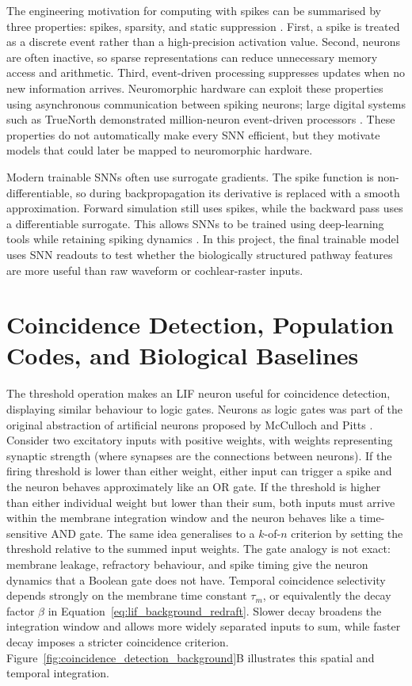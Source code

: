 The engineering motivation for computing with spikes can be summarised by three properties: spikes, sparsity, and static suppression \cite{Eshraghian2023TRAININGLEARNING}. First, a spike is treated as a discrete event rather than a high-precision activation value. Second, neurons are often inactive, so sparse representations can reduce unnecessary memory access and arithmetic. Third, event-driven processing suppresses updates when no new information arrives. Neuromorphic hardware can exploit these properties using asynchronous communication between spiking neurons; large digital systems such as TrueNorth demonstrated million-neuron event-driven processors \cite{Merolla2014AInterface}. These properties do not automatically make every SNN efficient, but they motivate models that could later be mapped to neuromorphic hardware.

Modern trainable SNNs often use surrogate gradients. The spike function is non-differentiable, so during backpropagation its derivative is replaced with a smooth approximation. Forward simulation still uses spikes, while the backward pass uses a differentiable surrogate. This allows SNNs to be trained using deep-learning tools while retaining spiking dynamics \cite{Eshraghian2023TRAININGLEARNING}. In this project, the final trainable model uses SNN readouts to test whether the biologically structured pathway features are more useful than raw waveform or cochlear-raster inputs.

\section{Coincidence Detection, Population Codes, and Biological Baselines}
\label{sec:coincidence_background}

The threshold operation makes an LIF neuron useful for coincidence detection, displaying similar behaviour to logic gates. Neurons as logic gates was part of the original abstraction of artificial neurons proposed by McCulloch and Pitts \cite{Mcculloch1990AN}. Consider two excitatory inputs with positive weights, with weights representing synaptic strength (where synapses are the connections between neurons). If the firing threshold is lower than either weight, either input can trigger a spike and the neuron behaves approximately like an OR gate. If the threshold is higher than either individual weight but lower than their sum, both inputs must arrive within the membrane integration window and the neuron behaves like a time-sensitive AND gate. The same idea generalises to a $k$-of-$n$ criterion by setting the threshold relative to the summed input weights. The gate analogy is not exact: membrane leakage, refractory behaviour, and spike timing give the neuron dynamics that a Boolean gate does not have. Temporal coincidence selectivity depends strongly on the membrane time constant $\tau_m$, or equivalently the decay factor $\beta$ in Equation~\ref{eq:lif_background_redraft}. Slower decay broadens the integration window and allows more widely separated inputs to sum, while faster decay imposes a stricter coincidence criterion. Figure~\ref{fig:coincidence_detection_background}B illustrates this spatial and temporal integration.

